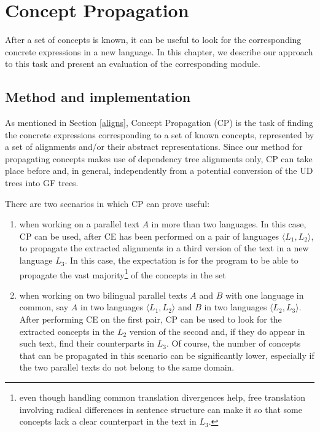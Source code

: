 \chapter{Concept Propagation} \label{ch4}
After a set of concepts is known, it can be useful to look for the corresponding concrete expressions in a new language. In this chapter, we describe our approach to this task and present an evaluation of the corresponding module.

\section{Method and implementation}
As mentioned in Section \ref{aligns}, Concept Propagation (CP) is the task of finding the concrete expressions corresponding to a set of known concepts, represented by a set of alignments and/or their abstract representations. Since our method for propagating concepts makes use of dependency tree alignments only, CP can take place before and, in general, independently from a potential conversion of the UD trees into GF trees. \smallskip

There are two scenarios in which CP can prove useful:\smallskip
\begin{enumerate}
    \item when working on a parallel text $A$ in more than two languages. In this case, CP can be used, after CE has been performed on a pair of languages $\langle L_1,L_2 \rangle$, to propagate the extracted alignments in a third version of the text in a new language $L_3$. In this case, the expectation is for the program to be able to propagate the vast majority\footnote{even though handling common translation divergences help, free translation involving radical differences in sentence structure can make it so that some concepts lack a clear counterpart in the text in $L_3$.} of the concepts in the set
    \item when working on two bilingual parallel texts $A$ and $B$ with one language in common, say $A$ in two languages $\langle L_1,L_2 \rangle$ and $B$ in two languages $\langle L_2, L_3 \rangle$. After performing CE on the first pair, CP can be used to look for the extracted concepts in the $L_2$ version of the second and, if they do appear in such text, find their counterparts in $L_3$. Of course, the number of concepts that can be propagated in this scenario can be significantly lower, especially if the two parallel texts do not belong to the same domain.
\end{enumerate}\smallskip

